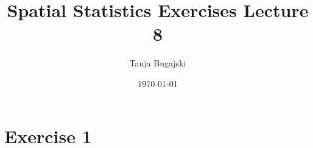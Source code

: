 \documentclass{article}
\title{Spatial Statistics Exercises Lecture 8}
\author{Tanja Bugajski}
\date{\today}
\begin{document}
\maketitle
\section*{Exercise 1}
\end{document}
